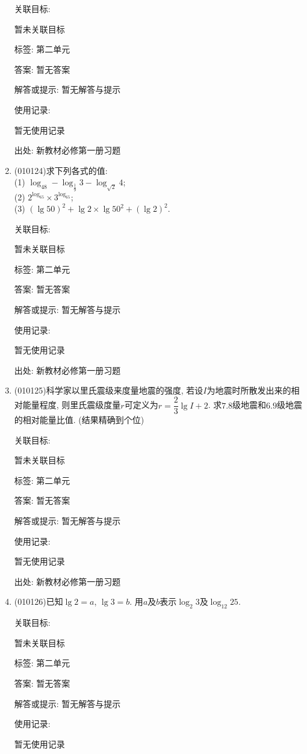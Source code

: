 \documentclass[10pt,a4paper]{article}
\begin{document}
\begin{enumerate}[1.]
关联目标:

暂未关联目标



标签: 第二单元

答案: 暂无答案

解答或提示: 暂无解答与提示

使用记录:

暂无使用记录


出处: 新教材必修第一册习题
\item { (010124)}求下列各式的值:\\
(1) $\log_48-\log_{\frac 19}3-\log_{\sqrt 2}4$;\\
(2) $2^{\log_65}\times 3^{\log_65}$;\\
(3) $(\lg 50)^2+\lg 2\times \lg 50^2+(\lg 2)^2$.


关联目标:

暂未关联目标



标签: 第二单元

答案: 暂无答案

解答或提示: 暂无解答与提示

使用记录:

暂无使用记录


出处: 新教材必修第一册习题
\item { (010125)}科学家以里氏震级来度量地震的强度, 若设$I$为地震时所散发出来的相对能量程度, 则里氏震级度量$r$可定义为$r=\dfrac 23\lg I+2$. 求$7.8$级地震和$6. 9$级地震的相对能量比值. (结果精确到个位)


关联目标:

暂未关联目标



标签: 第二单元

答案: 暂无答案

解答或提示: 暂无解答与提示

使用记录:

暂无使用记录


出处: 新教材必修第一册习题
\item { (010126)}已知$\lg 2=a$, $\lg 3=b$. 用$a$及$b$表示$\log_2 3$及$\log_{12}25$.


关联目标:

暂未关联目标



标签: 第二单元

答案: 暂无答案

解答或提示: 暂无解答与提示

使用记录:

暂无使用记录



\end{enumerate}
\end{document}
